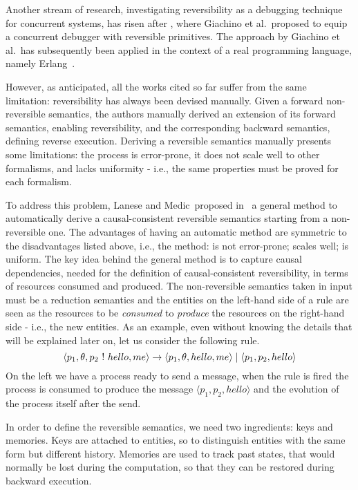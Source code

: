 \documentclass{article}[12pt,a4paper]
\theoremstyle{definition}
\newcommand{\paral}{\;|\;}
\begin{document}
Another stream of research, investigating reversibility as a debugging technique for concurrent systems,
has risen after \cite{GiachinoLM14}, where Giachino et al.~proposed to
equip a concurrent debugger with reversible primitives.
The approach by Giachino et al.~has subsequently been applied in the context of a real programming language, namely Erlang~\cite{LaneseNPV18,Lanese0PV18,Gonzalez-AbrilV21,FabbrettiLS21}.

However, as anticipated, all the works cited so far suffer from the same limitation: reversibility has always been
devised manually. Given a forward non-reversible semantics, the authors manually
derived an extension of its forward semantics, enabling reversibility, and the corresponding backward semantics, defining reverse execution.
Deriving a reversible semantics manually presents some limitations: the
process is error-prone, it does not scale well to other formalisms, and lacks
uniformity - i.e., the same properties must be proved for each formalism.

To address this problem, Lanese and Medic~proposed in~\cite{LaneseM20} a
general method to
automatically derive a causal-consistent reversible semantics starting from a non-reversible one. The
advantages of having an automatic method are symmetric to the disadvantages
listed above, i.e., the method: is not error-prone; scales well; is uniform. The key idea behind the general method is to capture
causal dependencies, needed for the definition of causal-consistent reversibility, in terms of resources consumed and produced. The non-reversible
semantics taken in input must be a reduction semantics and the entities on the
left-hand side of a rule are seen as the resources to be \emph{consumed} to
\emph{produce} the resources on the right-hand side - i.e., the new entities.
As an example, even without knowing the details that will be explained later on, let
us consider the following rule. 
\begin{equation}\label{samplerule}
\langle p_1, \theta, p_2~\ms{!}~hello, me\rangle \rightarrow \langle p_1, \theta,
hello, me\rangle \paral\langle p_1, p_2,hello \rangle
\end{equation}
On the left we have a process ready to send a
message, when the rule is fired the process is consumed to produce the message
$\langle p_1, p_2,hello \rangle$ and the evolution of the process itself after the send.

In order to define the reversible semantics, we need two ingredients: keys and memories.
Keys are attached to entities, so to distinguish entities with the same form but different history.
Memories are used to track past states, that would normally be lost during the computation, so that
they can be restored during backward execution.
\end{document}
